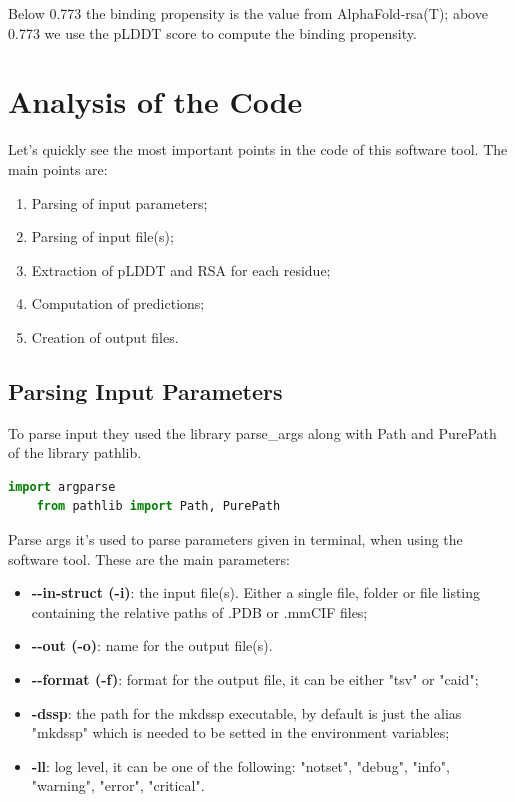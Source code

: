 Below 0.773 the binding propensity is the value from AlphaFold-rsa(T); above 0.773 we use the pLDDT score to compute the binding propensity.

\section{Analysis of the Code}
Let's quickly see the most important points in the code of this software tool. The main points are: 
\begin{enumerate}

    \item Parsing of input parameters;
    \item Parsing of input file(s);
    \item Extraction of pLDDT and RSA for each residue;
    \item Computation of predictions;
    \item Creation of output files.
\end{enumerate}

\pagebreak

\subsection{Parsing Input Parameters}
To parse input they used the library parse\_args along with Path and PurePath of the library pathlib.

\begin{lstlisting}[language=Python, caption=Import\ libraries\ parsing, label={code:parseargs}]
    import argparse
    from pathlib import Path, PurePath
\end{lstlisting}

Parse args it's used to parse parameters given in terminal, when using the software tool. These are the main parameters:
\begin{itemize}
    \item \textbf{-\vspace{0.1cm}-in-struct (-i)}: the input file(s). Either a single file, folder or file listing containing the relative paths of .PDB or .mmCIF files;
    \item \textbf{-\vspace{0.1cm}-out (-o)}: name for the output file(s).
    \item \textbf{-\vspace{0.1cm}-format (-f)}: format for the output file, it can be either "tsv" or "caid";
    \item \textbf{-dssp}: the path for the mkdssp executable, by default is just the alias "mkdssp" which is needed to be setted in the environment variables;
    \item \textbf{-ll}: log level, it can be one of the following: "notset", "debug", "info", "warning", "error", "critical".
\end{itemize}

